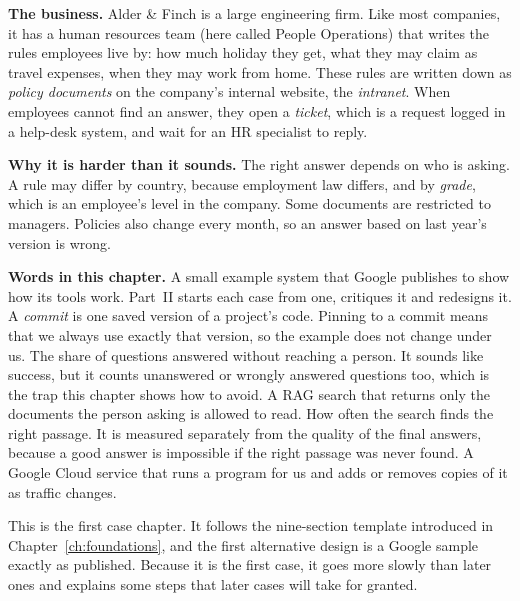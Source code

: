 \begin{beforeyoustart}
\textbf{The business.} Alder \& Finch is a large engineering firm. Like most companies, it has a human resources team (here called People Operations) that writes the rules employees live by: how much holiday they get, what they may claim as travel expenses, when they may work from home. These rules are written down as \emph{policy documents} on the company's internal website, the \emph{intranet}. When employees cannot find an answer, they open a \emph{ticket}, which is a request logged in a help-desk system, and wait for an HR specialist to reply.

\textbf{Why it is harder than it sounds.} The right answer depends on who is asking. A rule may differ by country, because employment law differs, and by \emph{grade}, which is an employee's level in the company. Some documents are restricted to managers. Policies also change every month, so an answer based on last year's version is wrong.

\textbf{Words in this chapter.}
 A small example system that Google publishes to show how its tools work. Part~II starts each case from one, critiques it and redesigns it.
 A \emph{commit} is one saved version of a project's code. Pinning to a commit means that we always use exactly that version, so the example does not change under us.
 The share of questions answered without reaching a person. It sounds like success, but it counts unanswered or wrongly answered questions too, which is the trap this chapter shows how to avoid.
 A RAG search that returns only the documents the person asking is allowed to read.
 How often the search finds the right passage. It is measured separately from the quality of the final answers, because a good answer is impossible if the right passage was never found.
 A Google Cloud service that runs a program for us and adds or removes copies of it as traffic changes.
\end{beforeyoustart}


This is the first case chapter. It follows the nine-section template introduced in Chapter~\ref{ch:foundations}, and the first alternative design is a Google sample exactly as published. Because it is the first case, it goes more slowly than later ones and explains some steps that later cases will take for granted.

